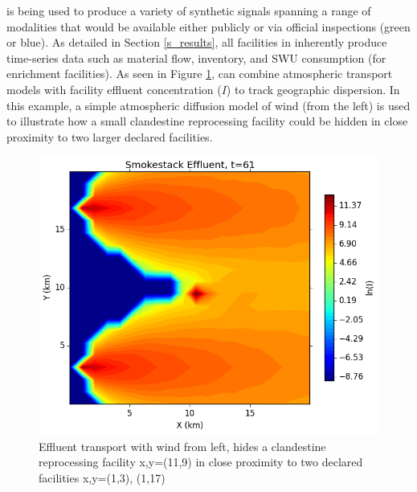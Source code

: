 \Cyclus is being used to produce a variety of synthetic signals spanning a range of modalities that would be available either publicly or via official inspections (green or blue).  As detailed in Section \ref{s_results}, all facilities in \Cyclus inherently produce time-series data such as material flow, inventory, and \gls{SWU} consumption (for enrichment facilities). As seen in Figure \ref{fig:effluent}, \Cyclus can combine atmospheric transport models with facility effluent concentration ($I$) to track geographic dispersion. In this example, a simple atmospheric diffusion model of wind (from the left) is used to illustrate how a small clandestine reprocessing facility could be hidden in close proximity to two larger declared facilities\cite{hanna_handbook_1982}. 

\begin{figure}%
\begin{center}
\includegraphics[natwidth=162bp,natheight=227bp, scale=0.4]{./figs/proper_diff_fr61.png}
\end{center}
\caption{Effluent transport with wind from left, hides a clandestine reprocessing facility x,y=(11,9) in close proximity to two declared facilities x,y=(1,3), (1,17)}
\label{fig:effluent}
\end{figure}

